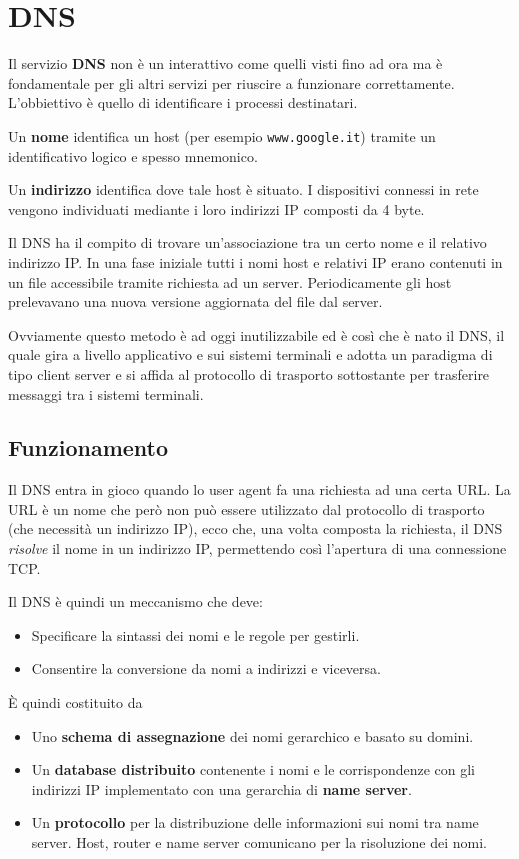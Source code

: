 \section{DNS}
Il servizio \textbf{DNS} non è un interattivo come quelli visti fino ad ora ma è fondamentale per
gli altri servizi per riuscire a funzionare correttamente. L'obbiettivo è quello di identificare i
processi destinatari.

Un \textbf{nome} identifica un host (per esempio \verb|www.google.it|) tramite un identificativo
logico e spesso mnemonico.

Un \textbf{indirizzo} identifica dove tale host è situato. I dispositivi connessi in rete vengono
individuati mediante i loro indirizzi IP composti da 4 byte.

Il DNS ha il compito di trovare un'associazione tra un certo nome e il relativo indirizzo IP. In
una fase iniziale tutti i nomi host e relativi IP erano contenuti in un file accessibile tramite
richiesta ad un server. Periodicamente gli host prelevavano una nuova versione aggiornata del file
dal server.

Ovviamente questo metodo è ad oggi inutilizzabile ed è così che è nato il DNS, il quale gira a 
livello applicativo e sui sistemi terminali e adotta un paradigma di tipo client server e si affida
al protocollo di trasporto sottostante per trasferire messaggi tra i sistemi terminali.

\subsection{Funzionamento}
Il DNS entra in gioco quando lo user agent fa una richiesta ad una certa URL. La URL è un nome che
però non può essere utilizzato dal protocollo di trasporto (che necessità un indirizzo IP), ecco
che, una volta composta la richiesta, il DNS \emph{risolve} il nome in un indirizzo IP, permettendo
così l'apertura di una connessione TCP.

Il DNS è quindi un meccanismo che deve:
\begin{itemize}
	\item Specificare la sintassi dei nomi e le regole per gestirli.
	\item Consentire la conversione da nomi a indirizzi e viceversa.
\end{itemize}
\`E quindi costituito da
\begin{itemize}
	\item Uno \textbf{schema di assegnazione} dei nomi gerarchico e basato su domini.
	\item Un \textbf{database distribuito} contenente i nomi e le corrispondenze con gli indirizzi
		IP implementato con una gerarchia di \textbf{name server}.
	\item Un \textbf{protocollo} per la distribuzione delle informazioni sui nomi tra name server.
		Host, router e name server comunicano per la risoluzione dei nomi.
\end{itemize}

